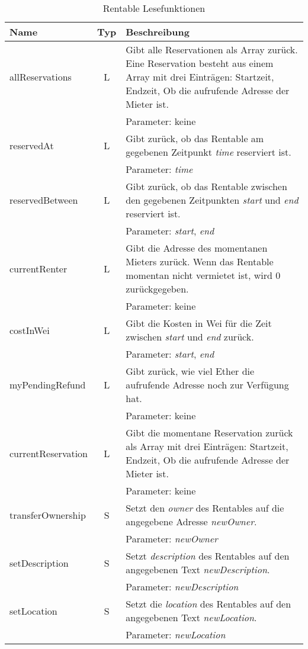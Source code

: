 \begin{longtable}{@{}lcL{9cm}@{}}
\caption{Rentable Lesefunktionen}\label{tbl:Rentable_Funktionsuebersicht}\\
\toprule
Name & Typ & Beschreibung \\ \midrule
allReservations     & L   & Gibt alle Reservationen als Array zurück. Eine Reservation besteht aus einem Array mit drei Einträgen: Startzeit, Endzeit, Ob die aufrufende Adresse der Mieter ist.\\
 & & Parameter: keine \\\midrule
reservedAt          & L   & Gibt zurück, ob das Rentable am gegebenen Zeitpunkt \emph{time} reserviert ist.\\ & & Parameter: \emph{time} \\\midrule
reservedBetween     & L   & Gibt zurück, ob das Rentable zwischen den gegebenen Zeitpunkten \emph{start} und \emph{end} reserviert ist.\\ & & Parameter: \emph{start}, \emph{end} \\\midrule
currentRenter       & L   & Gibt die Adresse des momentanen Mieters zurück. Wenn das Rentable momentan nicht vermietet ist, wird 0 zurückgegeben.\\ & & Parameter: keine \\\midrule
costInWei           & L   & Gibt die Kosten in Wei für die Zeit zwischen \emph{start} und \emph{end} zurück.\\ & & Parameter: \emph{start}, \emph{end} \\\midrule
myPendingRefund     & L   & Gibt zurück, wie viel Ether die aufrufende Adresse noch zur Verfügung hat.\\ & & Parameter: keine \\ \midrule
currentReservation  & L   & Gibt die momentane Reservation zurück als Array mit drei Einträgen: Startzeit, Endzeit, Ob die aufrufende Adresse der Mieter ist.\\ & & Parameter: keine \\\midrule
transferOwnership   & S   & Setzt den \emph{owner} des Rentables auf die angegebene Adresse \emph{newOwner}.\\ & & Parameter: \emph{newOwner} \\\midrule
setDescription   & S   & Setzt \emph{description} des Rentables auf den angegebenen Text \emph{newDescription}.\\ & & Parameter: \emph{newDescription} \\\midrule
setLocation   & S   & Setzt die \emph{location} des Rentables auf den angegebenen Text \emph{newLocation}.\\ & & Parameter: \emph{newLocation} \\\midrule

\end{longtable}
